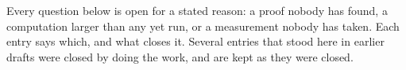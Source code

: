 


Every question below is open for a stated reason: a proof nobody has
found, a computation larger than any yet run, or a measurement nobody
has taken. Each entry says which, and what closes it. Several entries
that stood here in earlier drafts were closed by doing the work, and
are kept as they were closed.

